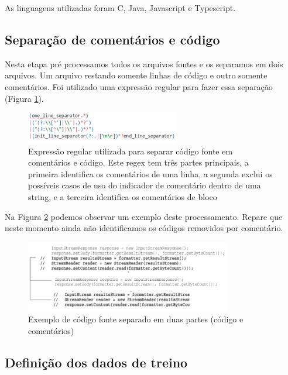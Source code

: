 \documentclass[12pt]{article}
\begin{document}
As linguagens utilizadas foram C, Java, Javascript e
Typescript.

\subsection{Separação de comentários e código}

Nesta etapa pré processamos todos os arquivos fontes e os separamos em dois arquivos. 
Um arquivo restando somente linhas de código e outro somente comentários.
Foi utilizado uma expressão regular para fazer essa separação (Figura \ref{fig:regex}).

\begin{figure}[ht]
  \centering
  \includegraphics[width=0.6\textwidth]{../images/regex.png}
  \caption{Expressão regular utilizada para separar código fonte em comentários e código.
  Este regex tem três partes principais, a primeira identifica os comentários de uma linha,
  a segunda exclui os possíveis casos de uso do indicador de comentário dentro de uma string,
  e a terceira identifica os comentários de bloco }
  \label{fig:regex}
\end{figure}

Na Figura \ref{fig:sep-comment} podemos observar um exemplo deste processamento.
Repare que neste momento ainda não identificamos os códigos removidos por comentário. 

\begin{figure}[ht]
  \centering
  \includegraphics[width=0.8\textwidth]{../images/separated-comments.png}
  \caption{Exemplo de código fonte separado em duas partes (código e comentários) }
  \label{fig:sep-comment}
\end{figure}


\subsection{Definição dos dados de treino}
 
\end{document}

